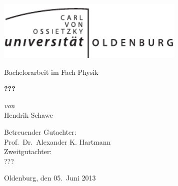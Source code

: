 \begin{titlepage}
\begin{center}

\includegraphics[width=90mm]{images/Uniol_1c.pdf}\\
\vspace{25mm}

{\LARGE  Bachelorarbeit im Fach Physik\\}

\vspace{10mm}

{\LARGE \bfseries
???
\\}

\vspace{20mm} 

\begin{minipage}{0.4\textwidth}
\begin{center} \large
\emph{von}\\
\large
Hendrik Schawe\\
\end{center}
\end{minipage}

\vspace{45mm}

{\large
Betreuender Gutachter:\\
Prof.\ Dr.\ Alexander K. Hartmann\\
}
\vspace{8mm}
{\large
Zweitgutachter:\\
???\\
}
			
\vfill
{\large Oldenburg, den 05.\ Juni 2013}
\newpage

\end{center}

\end{titlepage}
